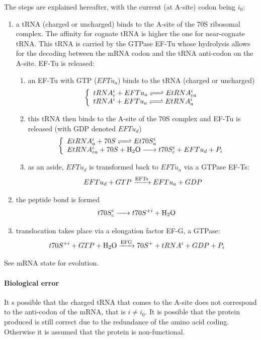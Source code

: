The steps are explained hereafter, with the current (at A-site) codon being $i_0$:
\begin{enumerate}
  \item a tRNA (charged or uncharged) binds to the A-site of the 70S ribosomal complex. The affinity for cognate tRNA is higher the one for near-cognate tRNA. This tRNA is carried by the GTPase EF-Tu whose hydrolysis allows for the decoding between the mRNA codon and the tRNA anti-codon on the A-site. EF-Tu is released:
      \begin{enumerate}
        \item an EF-Tu with GTP ($EFTu_a$) binds to the tRNA (charged or uncharged)
          $$
            \left\{
            \begin{array}{l}
              \reactionRev{tRNA^i_c + EFTu_a}{EtRNA^i_{ca}}{}{} \\
              \reactionRev{tRNA^i + EFTu_a}{EtRNA^i_{a}}{}{} \\
            \end{array}
          \right.
          $$
        \item this tRNA then binds to the A-site of the 70S complex and EF-Tu is released (with GDP denoted $EFTu_d$)
          $$
            \left\{
            \begin{array}{l}
              \reactionRev{EtRNA^i_{a} + 70S}{Et70S^i_{a}}{}{} \\
              \reactionIrr{EtRNA^i_{ca} + 70S +\ce{H2O}}{t70S^i_{c} + EFTu_d + P_i}{}{} \\
            \end{array}
          \right.
          $$
        \item as an aside, $EFTu_d$ is transformed back to $EFTu_a$ via a GTPase EF-Ts:
          $$
            \reactionIrr{EFTu_d + GTP}{EFTu_a + GDP}{EFTs}{}
          $$
      \end{enumerate}
  \item the peptide bond is formed
    $$
      \reactionIrr{t70S^i_{c}}{t70S^{+i} + \ce{H2O}}{}{}
    $$
  \item translocation takes place via a elongation factor EF-G, a GTPase:
    $$
      \reactionIrr{t70S^{+i} + GTP+\ce{H2O}}{70S^{+} + tRNA^i + GDP + P_i}{EFG}{}
    $$
\end{enumerate}
See mRNA state for evolution.


\paragraph{Biological error} It s possible that the charged tRNA that comes to the A-site does not correspond to the anti-codon of the mRNA, that is $i\neq i_0$. It is possible that the protein produced is still correct due to the redundance of the amino acid coding. Otherwise it is assumed that the protein is non-functional.



